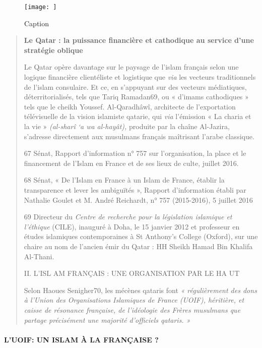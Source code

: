\begin{figure}
    \centering
    \texttt{[image: ]}
    \caption{Caption}
    \label{fig:my_label}
\end{figure}
\begin{quote}
\textbf{Le Qatar : la puissance financière et cathodique au service
d'une stratégie oblique}

Le Qatar opère davantage sur le paysage de l'islam français selon une
logique financière clientéliste et logistique que \emph{via} les
vecteurs traditionnels de l'islam consulaire. Et ce, en s'appuyant sur
des vecteurs médiatiques, déterritorialisés, tels que Tariq Ramadan69,
ou « d'imams cathodiques » tels que le cheikh Youssef. Al-Qaradhâwî,
architecte de l'exportation télévisuelle de la vision islamiste qatarie,
qui \emph{via} l'émission « La charia et la vie » \emph{(al-sharî `a wa
al-hayât),} produite par la chaîne Al-Jazira, s'adresse directement aux
musulmans français maîtrisant l'arabe classique.

67 Sénat, Rapport d'information n° 757 sur l'organisation, la place et
le financement de l'Islam en France et de ses lieux de culte, juillet
2016.

68 Sénat, « De l'Islam en France à un Islam de France, établir la
transparence et lever les ambiguïtés », Rapport d'information établi par
Nathalie Goulet et M. André Reichardt, n° 757 (2015-2016), 5 juillet
2016

69 Directeur du \emph{Centre de recherche pour la législation islamique
et l'éthique} (CILE), inauguré à Doha, le 15 janvier 2012 et professeur
en études islamiques contemporaines à St Anthony's College (Oxford), sur
une chaire au nom de l'ancien émir du Qatar : HH Sheikh Hamad Bin
Khalifa Al-Thani.

II. L'ISL AM FRANÇAIS : UNE ORGANISATION PAR LE HA UT

Selon Haoues Senigher70, les mécènes qataris font \emph{« régulièrement
des dons à l'Union des Organisations Islamiques de France (UOIF),
héritière, et caisse de résonance française, de l'idéologie des Frères
musulmans que partage précisément une majorité d'officiels qataris. »}
\end{quote}

\hypertarget{luoif-un-islam-uxe0-la-franuxe7aise}{%
\paragraph{L'UOIF: UN ISLAM À LA FRANÇAISE
?}\label{luoif-un-islam-uxe0-la-franuxe7aise}}

